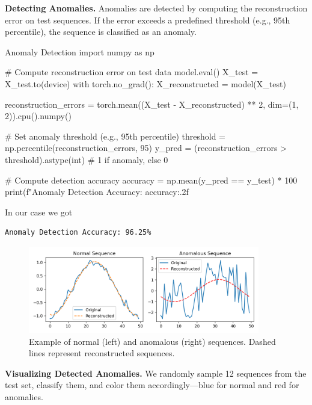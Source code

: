 {\bf Detecting Anomalies.} 
Anomalies are detected by computing the reconstruction error on test sequences. If the error exceeds a predefined threshold (e.g., 95th percentile), the sequence is classified as an anomaly.

\begin{codeonly}{Anomaly Detection}
import numpy as np

# Compute reconstruction error on test data
model.eval()
X_test = X_test.to(device)
with torch.no_grad():
    X_reconstructed = model(X_test)

reconstruction_errors = torch.mean((X_test - X_reconstructed) ** 2, dim=(1, 2)).cpu().numpy()

# Set anomaly threshold (e.g., 95th percentile)
threshold = np.percentile(reconstruction_errors, 95)
y_pred = (reconstruction_errors > threshold).astype(int)  # 1 if anomaly, else 0

# Compute detection accuracy
accuracy = np.mean(y_pred == y_test) * 100
print(f"Anomaly Detection Accuracy: {accuracy:.2f}%
\end{codeonly}

In our case we got 
\begin{verbatim}
Anomaly Detection Accuracy: 96.25%
\end{verbatim}

\begin{figure}[ht]
    \centering
    \includegraphics[width=0.9\textwidth]{images/lstm_anomaly_detection.png}
    \caption{Example of normal (left) and anomalous (right) sequences. Dashed lines represent reconstructed sequences.}
    \label{fig:anomaly_detection}
\end{figure}

{\bf Visualizing Detected Anomalies.} 
We randomly sample 12 sequences from the test set, classify them, and color them accordingly—blue for normal and red for anomalies.

